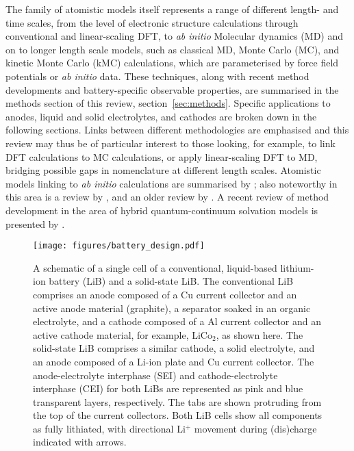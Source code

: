 \documentclass[../main.tex]{subfiles}
\begin{document}
The family of atomistic models itself represents a range of different length- and time scales, from the level of electronic structure calculations through conventional and linear-scaling DFT, to \textit{ab initio} Molecular dynamics (MD) and on to longer length scale models, such as classical MD, Monte Carlo (MC), and kinetic Monte Carlo (kMC) calculations, which are parameterised by force field potentials or \textit{ab initio} data. These techniques, along with recent method developments and battery-specific observable properties, are summarised in the methods section of this review, section~\ref{sec:methods}. Specific applications to anodes, liquid and solid electrolytes, and cathodes are broken down in the following sections. Links between different methodologies are emphasised and this review may thus be of particular interest to those looking, for example, to link DFT calculations to MC calculations, or apply linear-scaling DFT to MD, bridging possible gaps in nomenclature at different length scales. Atomistic models linking to \textit{ab initio} calculations are summarised by \citeauthor{VanderVen2020} \cite{VanderVen2020}; also noteworthy in this area is a review by \citeauthor{Shi_2016},\cite{Shi_2016} and an older review by \citeauthor{franco2013multiscale}.\cite{franco2013multiscale} A recent review of method development in the area of hybrid quantum-continuum solvation models is presented by \citeauthor{Herbert2021}.\cite{Herbert2021}

\begin{figure}
    \centering
    \texttt{[image: figures/battery\_design.pdf]}
    \caption{A schematic of a single cell of a conventional, liquid-based lithium-ion battery (LiB) and a solid-state LiB. The conventional LiB comprises an anode composed of a Cu current collector and an active anode material (graphite), a separator soaked in an organic electrolyte, and a cathode composed of a Al current collector and an active cathode material, for example, LiCo$_2$, as shown here. The solid-state LiB comprises a similar cathode, a solid electrolyte, and an anode composed of a Li-ion plate and Cu current collector. The anode-electrolyte interphase (SEI) and cathode-electrolyte interphase (CEI) for both LiBs are represented as pink and blue transparent layers, respectively. The tabs are shown protruding from the top of the current collectors. Both LiB cells show all components as fully lithiated, with directional Li$^+$ movement during (dis)charge indicated with arrows.}
    \label{fig:battery_schematic}
\end{figure}
\end{document}
